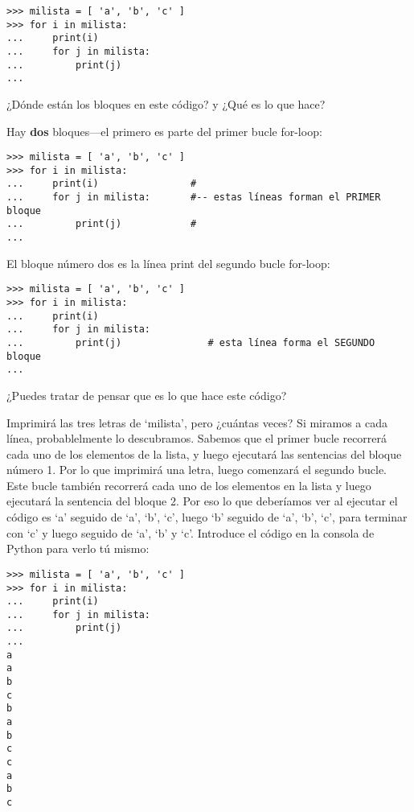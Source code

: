 \begin{listing}
\begin{verbatim}
>>> milista = [ 'a', 'b', 'c' ]
>>> for i in milista:
...     print(i)
...     for j in milista:
...         print(j)
...
\end{verbatim}
\end{listing}

\noindent

¿Dónde están los bloques en este código? y ¿Qué es lo que hace?
\par
\noindent
Hay \textbf{dos} bloques---el primero es parte del primer bucle for-loop:

\begin{listing}
\begin{verbatim}
>>> milista = [ 'a', 'b', 'c' ]
>>> for i in milista:
...     print(i)                #
...     for j in milista:       #-- estas líneas forman el PRIMER bloque
...         print(j)            #
...
\end{verbatim}
\end{listing}

El bloque número dos es la línea print del segundo bucle for-loop:

\begin{listing}
\begin{verbatim}
>>> milista = [ 'a', 'b', 'c' ]
>>> for i in milista:
...     print(i)
...     for j in milista:
...         print(j)               # esta línea forma el SEGUNDO bloque
...
\end{verbatim}
\end{listing}

¿Puedes tratar de pensar que es lo que hace este código?
\par
Imprimirá las tres letras de `milista', pero ¿cuántas veces?  Si miramos a cada línea, probablelmente lo descubramos. Sabemos que el primer bucle recorrerá cada uno de los elementos de la lista, y luego ejecutará las sentencias del bloque número 1. Por lo que imprimirá una letra, luego comenzará el segundo bucle. Este bucle también recorrerá cada uno de los elementos en la lista y luego ejecutará la sentencia del bloque 2.  Por eso lo que deberíamos ver al ejecutar el código es `a' seguido de `a', `b', `c', luego `b' seguido de `a', `b', `c', para terminar con `c' y luego seguido de `a', `b' y `c'.  Introduce el código en la consola de Python para verlo tú mismo:

\begin{listing}
\begin{verbatim}
>>> milista = [ 'a', 'b', 'c' ]
>>> for i in milista:
...     print(i)
...     for j in milista:
...         print(j)
... 
a
a
b
c
b
a
b
c
c
a
b
c
\end{verbatim}
\end{listing}

